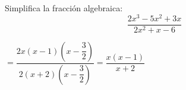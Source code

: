 \documentclass[addpoints,spanish, 12pt,a4paper]{exam}
\begin{document}
\begin{questions}









\addpoints

\question[1] Simplifica la fracción algebraica: $$\dfrac{2x^3-5x^2+3x}{2x^2+x-6} $$
\begin{solution}$=\dfrac{2x\left(x-1\right)\left(x-\dfrac{3}{2}\right)}{2\left(x+2\right)\left(x-\dfrac{3}{2}\right)}=\dfrac{x(x-1)}{x+2}$  \end{solution}



\end{questions}
\end{document}

